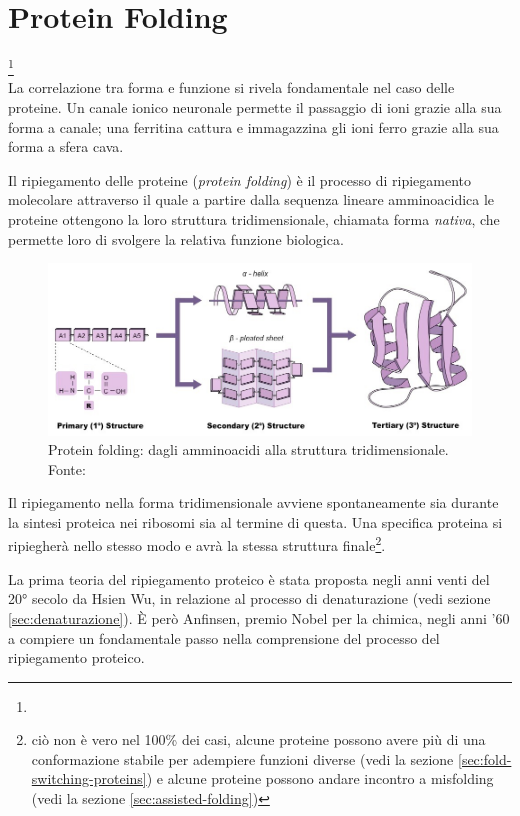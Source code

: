 \chapter{Protein Folding}
{
\footnote{}\\

La correlazione tra forma e funzione si rivela fondamentale nel caso delle proteine. Un canale ionico neuronale permette il passaggio di ioni grazie alla sua forma a canale; una ferritina cattura e immagazzina gli ioni ferro grazie alla sua forma a sfera cava. 

\par Il ripiegamento delle proteine (\textit{protein folding}) è il processo di ripiegamento molecolare attraverso il quale a partire dalla sequenza lineare amminoacidica le proteine ottengono la loro struttura tridimensionale, chiamata forma \textit{nativa}, che permette loro di svolgere la relativa funzione biologica. 

\begin{figure}[htp]
	\centering
	\includegraphics[scale=0.5]{images/protein-folding_med.jpeg}
	\caption{Protein folding: dagli amminoacidi alla struttura tridimensionale. Fonte: \cite{proteinStrucBioNinja}}
	\label{fig:protein-folding-bioninja}
\end{figure}


Il ripiegamento nella forma tridimensionale avviene spontaneamente sia durante la sintesi proteica nei ribosomi sia al termine di questa. Una specifica proteina si ripiegherà nello stesso modo e avrà la stessa struttura finale\footnote{ciò non è vero nel 100\% dei casi, alcune proteine possono avere più di una conformazione stabile per adempiere funzioni diverse (vedi la sezione \ref{sec:fold-switching-proteins}) e alcune proteine possono andare incontro a misfolding (vedi la sezione \ref{sec:assisted-folding})}.

\par La prima teoria del ripiegamento proteico è stata proposta negli anni venti del 20° secolo da Hsien Wu\supercite{wu1931studies}, in relazione al processo di denaturazione (vedi sezione \ref{sec:denaturazione}). È però Anfinsen, premio Nobel per la chimica, negli anni '60 a compiere un fondamentale passo nella comprensione del processo del ripiegamento proteico\supercite{anfinsen1972formation}. 

}

